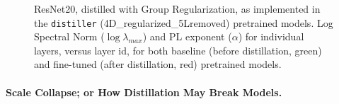 \begin{figure}[t]
   \centering
   \qquad
   \caption{%
            ResNet20, distilled with Group Regularization, as implemented in the \texttt{distiller} (4D\_regularized\_5Lremoved) pretrained models.  
            Log Spectral Norm ($\log\lambda_{max}$) and PL exponent ($\alpha$) for individual layers, versus layer id, for both baseline (before distillation, green) and fine-tuned (after distillation, red) pretrained models. 
           }
   \label{fig:resnet204D5L}
\end{figure}


\paragraph{Scale Collapse; or How Distillation May Break Models.}

